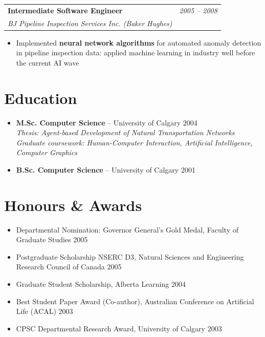 \documentclass[10pt]{article}
\makeatletter
\newcommand{\tech}[1]{\textcolor{secondary}{\textbf{#1}}}
\newcommand{\experience}[4]{%
  \vspace{4pt}
  \begin{tabular*}{\textwidth}{@{}l@{\extracolsep{\fill}}r@{}}
    \textbf{#1} & \textit{#2} \\
    \textit{\small#3} & \textit{\small#4}
  \end{tabular*}
  \vspace{-4pt}
}
\makeatother
\begin{document}
\experience{Intermediate Software Engineer}{2005 -- 2008}{BJ Pipeline Inspection Services Inc. (Baker Hughes)}{}
\begin{itemize}
    \item Implemented \textbf{neural network algorithms} for automated anomaly detection in pipeline inspection data: applied machine learning in industry well before the current AI wave
\end{itemize}

\section*{Education}
\begin{itemize}
    \item \tech{M.Sc. Computer Science} -- University of Calgary \hfill 2004 \\
    \textit{Thesis: Agent-based Development of Natural Transportation Networks} \\
    \textit{Graduate coursework: Human-Computer Interaction, Artificial Intelligence, Computer Graphics}
    \item \tech{B.Sc. Computer Science} -- University of Calgary \hfill 2001
\end{itemize}

\section*{Honours \& Awards}
\begin{itemize}[nosep,leftmargin=*]
    \item Departmental Nomination: Governor General's Gold Medal, Faculty of Graduate Studies \hfill 2005
    \item Postgraduate Scholarship NSERC D3, Natural Sciences and Engineering Research Council of Canada \hfill 2005
    \item Graduate Student Scholarship, Alberta Learning \hfill 2004
    \item Best Student Paper Award (Co-author), Australian Conference on Artificial Life (ACAL) \hfill 2003
    \item CPSC Departmental Research Award, University of Calgary \hfill 2003
\end{itemize}

\end{document}
